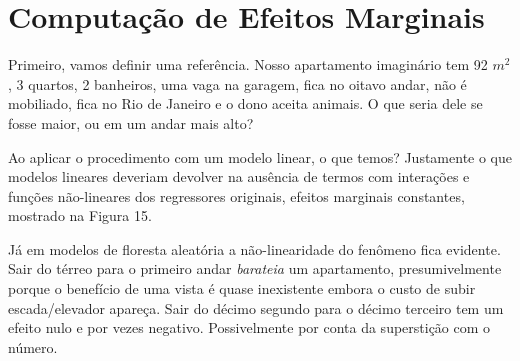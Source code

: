 



\section{Computação de Efeitos Marginais}

Primeiro, vamos definir uma referência. Nosso apartamento imaginário tem 92 $m^2$, 3 quartos, 2 banheiros, uma vaga na garagem, fica no oitavo andar, não é mobiliado, fica no Rio de Janeiro e o dono aceita animais. O que seria dele se fosse maior, ou em um andar mais alto?

Ao aplicar o procedimento com um modelo linear, o que temos? Justamente o que modelos lineares deveriam devolver na ausência de termos com interações e funções não-lineares dos regressores originais, efeitos marginais constantes, mostrado na Figura 15.

\begin{figure}[H]
    \label{ols_marg}
    \centering
    
\end{figure}

Já em modelos de floresta aleatória a não-linearidade do fenômeno fica evidente. Sair do térreo para o primeiro andar \textit{barateia} um apartamento, presumivelmente porque o benefício de uma vista é quase inexistente embora o custo de subir escada/elevador apareça. Sair do décimo segundo para o décimo terceiro tem um efeito nulo e por vezes negativo. Possivelmente por conta da superstição com o número.


